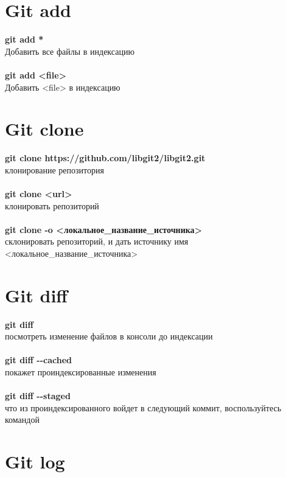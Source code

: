 \documentclass[a4paper, 12px]{report}
\begin{document}
\section{Git add}

\textbf{git add *}\\Добавить все файлы в индексацию\\\\
\textbf{git add <file>}\\Добавить <file> в индексацию

\section{Git clone}

\textbf{git clone https://github.com/libgit2/libgit2.git}
\\клонирование репозитория\\\\
\textbf{git clone <url>}\\клонировать репозиторий\\\\
\textbf{git clone -o <локальное\_название\_источника>}\\склонировать репозиторий, и дать источнику имя <локальное\_название\_источника>

\section{Git diff}

\textbf{git diff}\\посмотреть изменение файлов в консоли до индексации\\\\
\textbf{git diff -\--cached}\\покажет проиндексированные изменения\\\\
\textbf{git diff -\--staged}\\что из проиндексированного войдет в следующий коммит, воспользуйтесь командой

\section{Git log}
\end{document}
